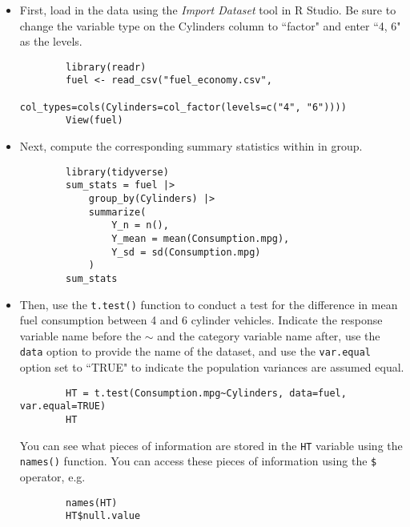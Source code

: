 \documentclass[11pt]{article}
\begin{document}
\begin{itemize}
	\item First, load in the data using the \textit{Import Dataset} tool in R Studio. Be sure to change the variable type on the Cylinders column to ``factor" and enter ``4, 6" as the levels.
	\begin{verbatim}
		library(readr)
		fuel <- read_csv("fuel_economy.csv", 
		                      col_types=cols(Cylinders=col_factor(levels=c("4", "6"))))
		View(fuel)
	\end{verbatim}
	\item Next, compute the corresponding summary statistics within in group.
	\begin{verbatim}
		library(tidyverse)
		sum_stats = fuel |> 
  			group_by(Cylinders) |>
  			summarize(
    			Y_n = n(),
    			Y_mean = mean(Consumption.mpg),
    			Y_sd = sd(Consumption.mpg)
  			)
		sum_stats
	\end{verbatim}
	\item Then, use the \texttt{t.test()} function to conduct a test for the difference in mean fuel consumption between 4 and 6 cylinder vehicles. Indicate the response variable name before the $\sim$ and the category variable name after, use the \texttt{data} option to provide the name of the dataset, and use the \texttt{var.equal} option set to ``TRUE" to indicate the population variances are assumed equal.
	\begin{verbatim}
		HT = t.test(Consumption.mpg~Cylinders, data=fuel, var.equal=TRUE)
		HT
	\end{verbatim}
	You can see what pieces of information are stored in the \texttt{HT} variable using the \texttt{names()} function. You can access these pieces of information using the \texttt{\$} operator, e.g.
	\begin{verbatim}
		names(HT)
		HT$null.value
	\end{verbatim}
\end{itemize}

\newpage
\end{document}
